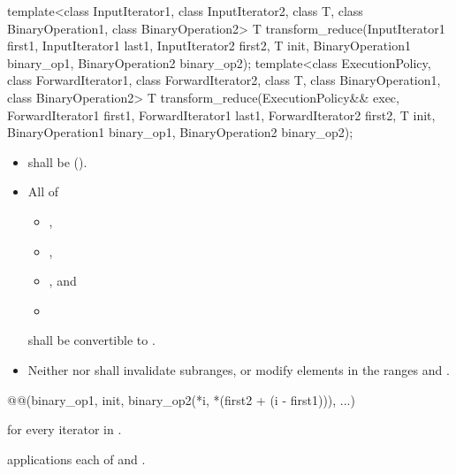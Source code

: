 %
\begin{itemdecl}
template<class InputIterator1, class InputIterator2, class T,
         class BinaryOperation1, class BinaryOperation2>
  T transform_reduce(InputIterator1 first1, InputIterator1 last1,
                     InputIterator2 first2,
                     T init,
                     BinaryOperation1 binary_op1,
                     BinaryOperation2 binary_op2);
template<class ExecutionPolicy,
         class ForwardIterator1, class ForwardIterator2, class T,
         class BinaryOperation1, class BinaryOperation2>
  T transform_reduce(ExecutionPolicy&& exec,
                     ForwardIterator1 first1, ForwardIterator1 last1,
                     ForwardIterator2 first2,
                     T init,
                     BinaryOperation1 binary_op1,
                     BinaryOperation2 binary_op2);
\end{itemdecl}

\begin{itemdescr}
\pnum
\requires
\begin{itemize}
\item
   shall be  ().
\item
  All of
  \begin{itemize}
  \item {},
  \item {},
  \item {}, and
  \item {}
  \end{itemize}
  shall be convertible to .
\item
  Neither  nor 
  shall invalidate subranges, or modify elements in the ranges
   and .
\end{itemize}

\pnum
\returns
\begin{codeblock}
@@(binary_op1, init, binary_op2(*i, *(first2 + (i - first1))), ...)
\end{codeblock}
for every iterator  in .

\pnum
\complexity
{} applications each
of  and .
\end{itemdescr}

